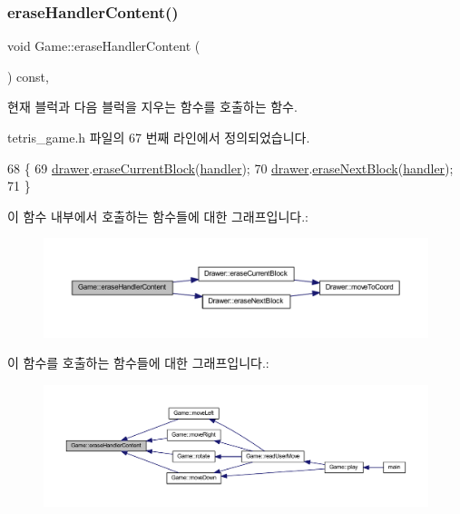 \subsubsection{\texorpdfstring{erase\+Handler\+Content()}{eraseHandlerContent()}}
{\footnotesize\ttfamily void Game\+::erase\+Handler\+Content (\begin{DoxyParamCaption}{ }\end{DoxyParamCaption}) const\hspace{0.3cm}{\ttfamily [inline]}, {\ttfamily [private]}}



현재 블럭과 다음 블럭을 지우는 함수를 호출하는 함수. 



tetris\+\_\+game.\+h 파일의 67 번째 라인에서 정의되었습니다.


\begin{DoxyCode}
68     \{
69         \mbox{\hyperlink{class_game_a045e1468514c0c0d51e968364e0678ad}{drawer}}.\mbox{\hyperlink{class_drawer_a513de5ba9d65771ed21918a90cd70afa}{eraseCurrentBlock}}(\mbox{\hyperlink{class_game_ae72b7259125e83dfd258c6a132394eec}{handler}});
70         \mbox{\hyperlink{class_game_a045e1468514c0c0d51e968364e0678ad}{drawer}}.\mbox{\hyperlink{class_drawer_a3110e80f9256176373f0580788e69037}{eraseNextBlock}}(\mbox{\hyperlink{class_game_ae72b7259125e83dfd258c6a132394eec}{handler}});
71     \}
\end{DoxyCode}
이 함수 내부에서 호출하는 함수들에 대한 그래프입니다.\+:
\nopagebreak
\begin{figure}[H]
\begin{center}
\leavevmode
\includegraphics[width=350pt]{class_game_a7ab3d17dc7bf72f0a59fbb7b17c6ce5a_cgraph}
\end{center}
\end{figure}
이 함수를 호출하는 함수들에 대한 그래프입니다.\+:
\nopagebreak
\begin{figure}[H]
\begin{center}
\leavevmode
\includegraphics[width=350pt]{class_game_a7ab3d17dc7bf72f0a59fbb7b17c6ce5a_icgraph}
\end{center}
\end{figure}
\mbox{\label{class_game_af379862400da53dd8f296f0990c0953f}} 
